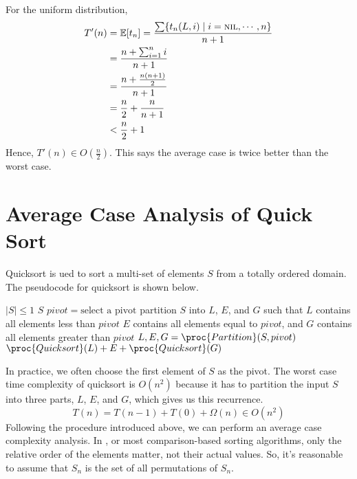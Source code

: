 \begin{enumerate}
    For the uniform distribution,
    $$
    \begin{aligned}
        T'(n) &= \mathbb{E}[t_n] = \frac{\sum \{ t_n(L,i) \mid i = \textsc{nil},\cdots,n \}}{n+1} \\
        &= \frac{n + \sum_{i=1}^n i}{n+1} \\
        &= \frac{n + \frac{n(n+1)}{2}}{n+1} \\
        &= \frac{n}{2} + \frac{n}{n+1} \\
        &< \frac{n}{2} + 1 
    \end{aligned}
    $$
    Hence, $\displaystyle T'(n) \in O(\frac{n}{2})$. This says the average case is twice better than the worst case.
\end{enumerate}

\section{Average Case Analysis of Quick Sort}

Quicksort is ued to sort a multi-set of elements $S$ from a totally ordered domain. The pseudocode for quicksort is shown below.

\begin{codebox}
    \li \If $|S| \leq 1$
    \li \Then \Return $S$ \End
    \li $pivot = \text{select a pivot}$
    \zi \Comment partition $S$ into $L$, $E$, and $G$ such that $L$ contains all elements less than $pivot$
    \zi \Comment $E$ contains all elements equal to $pivot$, and $G$ contains all elements greater than $pivot$
    \li $L,E,G = \proc{Partition}(S,pivot)$
    \li \Return $\proc{Quicksort}(L) + E + \proc{Quicksort}(G)$
\end{codebox}

In practice, we often choose the first element of $S$ as the pivot. The worst case time complexity of quicksort is $O(n^2)$ because it has to partition the input $S$ into three parts, $L$, $E$, and $G$, which gives us this recurrence.
$$
T(n) = T(n-1) + T(0) + \Omega(n) \in O(n^2)
$$
Following the procedure introduced above, we can perform an average case complexity analysis. In , or most comparison-based sorting algorithms, only the relative order of the elements matter, not their actual values. So, it's reasonable to assume that $S_n$ is the set of all permutations of $S_n$.

